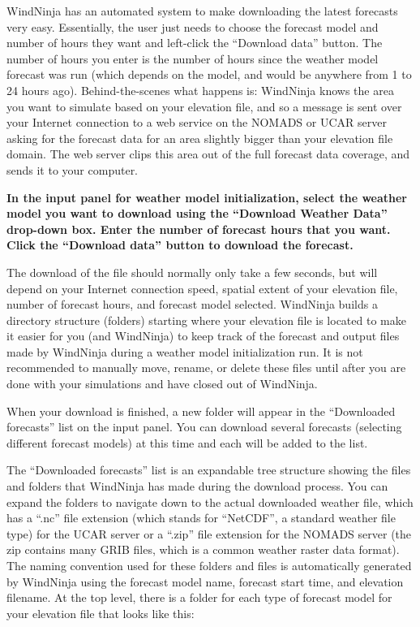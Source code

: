 \documentclass[12pt]{article}
\begin{document}
WindNinja has an automated system to make downloading the latest forecasts very easy.  Essentially, the user just needs to choose the forecast model and number of hours they want and left-click the “Download data” button.  The number of hours you enter is the number of hours since the weather model forecast was run (which depends on the model, and would be anywhere from 1 to 24 hours ago).  Behind-the-scenes what happens is: WindNinja knows the area you want to simulate based on your elevation file, and so a message is sent over your Internet connection to a web service on the NOMADS or UCAR server asking for the forecast data for an area slightly bigger than your elevation file domain.  The web server clips this area out of the full forecast data coverage, and sends it to your computer.

\textbf{\color{red} In the input panel for weather model initialization, select the weather model you want to download using the “Download Weather Data” drop-down box.  Enter the number of forecast hours that you want.  Click the “Download data” button to download the forecast.}

The download of the file should normally only take a few seconds, but will depend on your Internet connection speed, spatial extent of your elevation file, number of forecast hours, and forecast model selected.  WindNinja builds a directory structure (folders) starting where your elevation file is located to make it easier for you (and WindNinja) to keep track of the forecast and output files made by WindNinja during a weather model initialization run.  It is not recommended to manually move, rename, or delete these files until after you are done with your simulations and have closed out of WindNinja.

When your download is finished, a new folder will appear in the “Downloaded forecasts” list on the input panel.  You can download several forecasts (selecting different forecast models) at this time and each will be added to the list.

The “Downloaded forecasts” list is an expandable tree structure showing the files and folders that WindNinja has made during the download process.  You can expand the folders to navigate down to the actual downloaded weather file, which has a “.nc” file extension (which stands for “NetCDF”, a standard weather file type) for the UCAR server or a “.zip” file extension for the NOMADS server (the zip contains many GRIB files, which is a common weather raster data format).  The naming convention used for these folders and files is automatically generated by WindNinja using the forecast model name, forecast start time, and elevation filename.  At the top level, there is a folder for each type of forecast model for your elevation file that looks like this:
\end{document}
